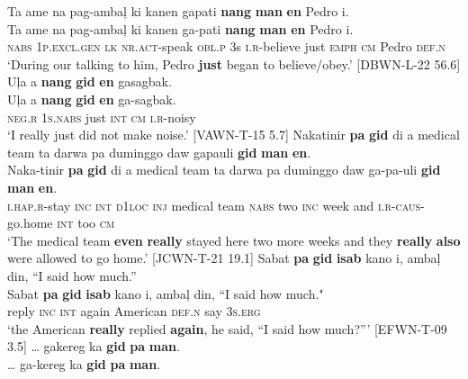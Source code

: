 \ea
\label{bkm:Ref329776500}
Ta  ame  na  pag-ambaļ  ki  kanen  gapati \textbf{nang}  \textbf{man}  \textbf{en}  Pedro  i. \\\smallskip
 \gll Ta  ame  na  pag-ambaļ  ki  kanen  ga-pati \textbf{nang}  \textbf{man}  \textbf{en}  Pedro  i. \\
\textsc{nabs}  1\textsc{p.excl.gen}  \textsc{lk}  \textsc{nr.act}-speak  \textsc{obl.p}  3s  \textsc{i.r}-believe
just  \textsc{emph}  \textsc{cm}  Pedro  \textsc{def.n} \\
\glt `During our talking to him, Pedro \textbf{just} began to believe/obey.’ [DBWN-L-22 56.6]
\z
\ea
\label{bkm:Ref329776503}
Uļa  a  \textbf{nang}  \textbf{gid}  \textbf{en}  gasagbak. \\\smallskip
 \gll Uļa  a  \textbf{nang}  \textbf{gid}  \textbf{en}  ga-sagbak. \\
\textsc{neg.r}  1\textsc{s.nabs}  just  \textsc{int}  \textsc{cm}  \textsc{i.r}-noisy \\
\glt ‘I really just did not make noise.’ [VAWN-T-15 5.7]
\z
\ea
Nakatinir  \textbf{pa}  \textbf{gid}  di  a  medical team  ta  darwa  pa  duminggo  daw  gapauli  \textbf{gid}  \textbf{man}  \textbf{en}. \\\smallskip
 \gll Naka-tinir  \textbf{pa}  \textbf{gid}  di  a  medical team  ta  darwa  pa  duminggo  daw  ga-pa-uli  \textbf{gid}  \textbf{man}  \textbf{en}. \\
\textsc{i.hap.r}-stay  \textsc{inc}  \textsc{int}  \textsc{d}1\textsc{loc}  \textsc{inj}  medical team  \textsc{nabs}  two  \textsc{inc}  week
and   \textsc{i.r}-\textsc{caus}-go.home  \textsc{int}  too  \textsc{cm} \\
\glt `The medical team \textbf{even} \textbf{really} stayed here two more weeks and they \textbf{really} \textbf{also} were allowed to go home.’ [JCWN-T-21 19.1]
\z
\ea
Sabat  \textbf{pa}  \textbf{gid}  \textbf{isab}  kano  i,  ambaļ  din,  “I said how much.'' \\\smallskip
 \gll Sabat  \textbf{pa}  \textbf{gid}  \textbf{isab}  kano  i,  ambaļ  din,  “I said how much." \\
reply  \textsc{inc}  \textsc{int}  again  American  \textsc{def.n}  say  3\textsc{s.erg} \\
\glt ‘the American \textbf{really} replied \textbf{again}, he said, “I said how much?”' [EFWN-T-09 3.5]
\z
\ea
… gakereg  ka  \textbf{gid}  \textbf{pa}  \textbf{man}. \\\smallskip
 \gll … ga-kereg  ka  \textbf{gid}  \textbf{pa}  \textbf{man}. \\

